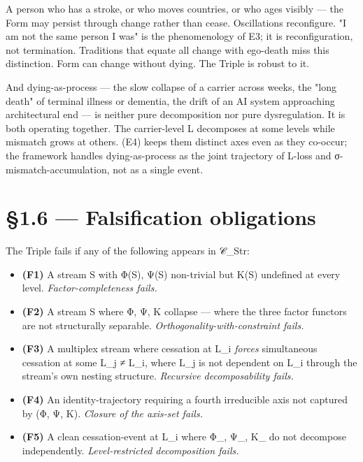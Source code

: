 \documentclass[11pt, openany]{book}
\newcommand{\sectionbreak}{\clearpage}
\begin{document}
A person who has a stroke, or who moves countries, or who ages visibly --- the Form may persist through change rather than cease. Oscillations reconfigure. "I am not the same person I was" is the phenomenology of E3; it is reconfiguration, not termination. Traditions that equate all change with ego-death miss this distinction. Form can change without dying. The Triple is robust to it.

And dying-as-process --- the slow collapse of a carrier across weeks, the "long death" of terminal illness or dementia, the drift of an AI system approaching architectural end --- is neither pure decomposition nor pure dysregulation. It is both operating together. The carrier-level L decomposes at some levels while mismatch grows at others. (E4) keeps them distinct axes even as they co-occur; the framework handles dying-as-process as the joint trajectory of L-loss and σ-mismatch-accumulation, not as a single event.

\sectionbreak

\section{§1.6 --- Falsification obligations}

The Triple fails if any of the following appears in 𝒞\_\allowbreak{}Str:

\begin{itemize}
\item \textbf{(F1)} A stream S with Φ(S), Ψ(S) non-trivial but Κ(S) undefined at every level. \textit{Factor-completeness fails.}
\item \textbf{(F2)} A stream S where Φ, Ψ, Κ collapse --- where the three factor functors are not structurally separable. \textit{Orthogonality-with-constraint fails.}
\item \textbf{(F3)} A multiplex stream where cessation at L\_\allowbreak{}i \textit{forces} simultaneous cessation at some L\_\allowbreak{}j ≠ L\_\allowbreak{}i, where L\_\allowbreak{}j is not dependent on L\_\allowbreak{}i through the stream's own nesting structure. \textit{Recursive decomposability fails.}
\item \textbf{(F4)} An identity-trajectory requiring a fourth irreducible axis not captured by (Φ, Ψ, Κ). \textit{Closure of the axis-set fails.}
\item \textbf{(F5)} A clean cessation-event at L\_\allowbreak{}i where Φ\_, Ψ\_, Κ\_ do not decompose independently. \textit{Level-restricted decomposition fails.}
\end{itemize}
\end{document}

